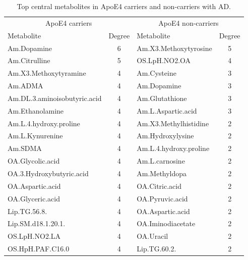 \documentclass{amsart}
\begin{document}
\begin{table}[H]
  \caption{\label{tab:degrees} Top central metabolites in ApoE4 carriers and non-carriers with AD.}
  \begin{threeparttable}
  \begin{tabular}{lclc}\toprule
  \multicolumn{2}{c}{ApoE4 carriers} & \multicolumn{2}{c}{ApoE4 non-carriers} \\
  Metabolite & Degree & Metabolite & Degree \\ \midrule
  Am.Dopamine                    & 6      & Am.X3.Methoxytyrosine         & 5      \\
  Am.Citrulline                  & 5      & OS.LpH.NO2.OA                 & 4      \\
  Am.X3.Methoxytyramine          & 4      & Am.Cysteine                   & 3      \\
  Am.ADMA                        & 4      & Am.Dopamine                   & 3      \\
  Am.DL.3.aminoisobutyric.acid   & 4      & Am.Glutathione                & 3      \\
  Am.Ethanolamine                & 4      & Am.L.Aspartic.acid            & 3      \\
  Am.L.4.hydroxy.proline         & 4      & Am.X3.Methylhistidine         & 2      \\
  Am.L.Kynurenine                & 4      & Am.Hydroxylysine              & 2      \\
  Am.SDMA                        & 4      & Am.L.4.hydroxy.proline        & 2      \\
  OA.Glycolic.acid               & 4      & Am.L.carnosine                & 2      \\
  OA.3.Hydroxybutyric.acid       & 4      & Am.Methyldopa                 & 2      \\
  OA.Aspartic.acid               & 4      & OA.Citric.acid                & 2      \\
  OA.Glyceric.acid               & 4      & OA.Pyruvic.acid               & 2      \\
  Lip.TG.56.8.                   & 4      & OA.Aspartic.acid              & 2      \\
  Lip.SM.d18.1.20.1.             & 4      & OA.Iminodiacetate             & 2      \\
  OS.LpH.NO2.LA                  & 4      & OA.Uracil                     & 2      \\
  OS.HpH.PAF.C16.0               & 4      & Lip.TG.60.2.                  & 2      \\

\end{tabular}
\end{threeparttable}
\end{table}
\end{document}
